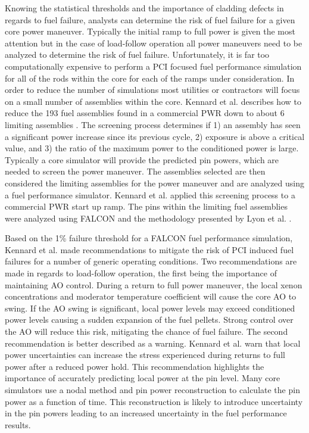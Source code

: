 \documentclass[edeposit,fullpage,11pt]{uiucthesis2009}
\begin{document}
Knowing the statistical thresholds and the importance of cladding defects in regards to fuel failure, analysts can determine the risk of fuel failure for a given core power maneuver.
Typically the initial ramp to full power is given the most attention but in the case of load-follow operation all power maneuvers need to be analyzed to determine the risk of fuel failure.
Unfortunately, it is far too computationally expensive to perform a \gls{PCI} focused fuel performance simulation for all of the rods within the core for each of the ramps under consideration.
In order to reduce the number of simulations most utilities or contractors will focus on a small number of assemblies within the core.
Kennard et al. describes how to reduce the 193 fuel assemblies found in a commercial \gls{PWR} down to about 6 limiting assemblies \cite{kennard_pci_2016}.
The screening process  determines if 1) an assembly has seen a significant power increase since its previous cycle, 2) exposure is above a critical value, and 3) the ratio of the maximum power to the conditioned power is large.
Typically a core simulator will provide the predicted pin powers, which are needed to screen the power maneuver.
The assemblies selected are then considered the limiting assemblies for the power maneuver and are analyzed using a fuel performance simulator.
Kennard et al. applied this screening process to a commercial \gls{PWR} start up ramp.
The pins within the limiting fuel assemblies were analyzed using FALCON and the methodology presented by Lyon et al. \cite{lyon_pci_2009}.

Based on the 1\% failure threshold for a FALCON fuel performance simulation, Kennard et al. made recommendations to mitigate the risk of \gls{PCI} induced fuel failures for a number of generic operating conditions.
Two recommendations are made in regards to load-follow operation, the first being the importance of maintaining \gls{AO} control.
During a return to full power maneuver, the local xenon concentrations and moderator temperature coefficient will cause the core \gls{AO} to swing.
If the \gls{AO} swing is significant, local power levels may exceed conditioned power levels causing a sudden expansion of the fuel pellets.
Strong control over the \gls{AO} will reduce this risk, mitigating the chance of fuel failure.
The second recommendation is better described as a warning.
Kennard et al. warn that local power uncertainties can increase the stress experienced during returns to full power after a reduced power hold.
This recommendation highlights the importance of accurately predicting local power at the pin  level.
Many core simulators use a nodal method and pin power reconstruction to calculate the pin power as a function of time.
This reconstruction is likely to introduce uncertainty in the pin powers leading to an increased uncertainty in the fuel performance results.
\end{document}
